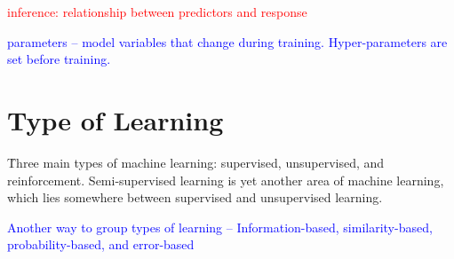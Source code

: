 \textcolor{red}{inference: relationship between predictors and response}

\textcolor{blue}{parameters -- model variables that change during training. Hyper-parameters are set before training.}

\section{Type of Learning}

\r{Three main types of machine learning: supervised, unsupervised, and reinforcement. Semi-supervised learning is yet another area of machine learning, which lies somewhere between supervised and unsupervised learning.}

\textcolor{blue}{Another way to group types of learning -- Information-based, similarity-based, probability-based, and error-based}



